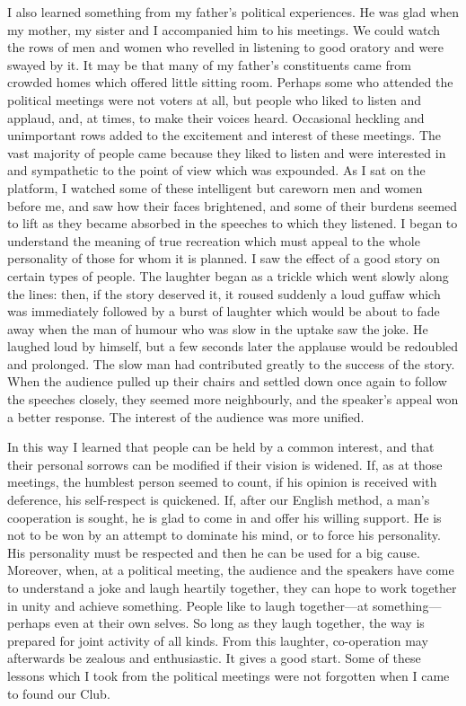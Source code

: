 I also learned something from my father’s political
experiences. He was glad when my mother, my sister and
I accompanied him to his meetings. We could watch the
rows of men and women who revelled in listening to good
oratory and were swayed by it. It may be that many of
my father’s constituents came from crowded homes which
offered little sitting room. Perhaps some who attended
the political meetings were not voters at all, but people
who liked to listen and applaud, and, at times, to make
their voices heard. Occasional heckling and unimportant
rows added to the excitement and interest of these
meetings. The vast majority of people came because
they liked to listen and were interested in and sympathetic
to the point of view which was expounded. As I sat on
the platform, I watched some of these intelligent but careworn
men and women before me, and saw how their faces
brightened, and some of their burdens seemed to lift as
they became absorbed in the speeches to which they
listened. I began to understand the meaning of true
recreation which must appeal to the whole personality of
those for whom it is planned. I saw the effect of a good
story on certain types of people. The laughter began as
a trickle which went slowly along the lines: then, if the
story deserved it, it roused suddenly a loud guffaw which
was immediately followed by a burst of laughter which
would be about to fade away when the man of humour
who was slow in the uptake saw the joke. He laughed
loud by himself, but a few seconds later the applause
would be redoubled and prolonged. The slow man had
contributed greatly to the success of the story. When the
audience pulled up their chairs and settled down once
again to follow the speeches closely, they seemed more
neighbourly, and the speaker’s appeal won a better
response. The interest of the audience was more unified.

In this way I learned that people can be held by a
common interest, and that their personal sorrows can
be modified if their vision is widened. If, as at those
meetings, the humblest person seemed to count, if his
opinion is received with deference, his self-respect is
quickened. If, after our English method, a man’s cooperation
is sought, he is glad to come in and offer his
willing support. He is not to be won by an attempt to
dominate his mind, or to force his personality. His personality
must be respected and then he can be used for a
big cause. Moreover, when, at a political meeting, the
audience and the speakers have come to understand a
joke and laugh heartily together, they can hope to work
together in unity and achieve something. People like to
laugh together—at something—perhaps even at their own
selves. So long as they laugh together, the way is prepared
for joint activity of all kinds. From this laughter,
co-operation may afterwards be zealous and enthusiastic.
It gives a good start. Some of these lessons which I took
from the political meetings were not forgotten when I
came to found our Club.

